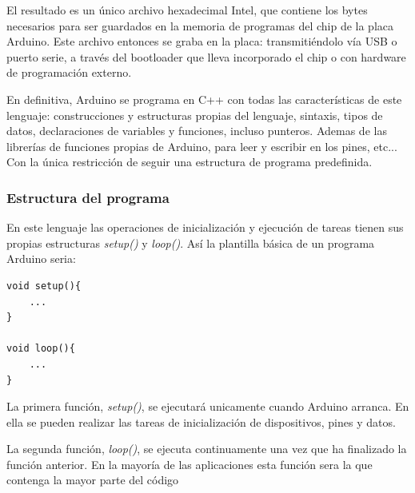 El resultado es un único archivo hexadecimal Intel, que contiene los bytes necesarios para ser guardados en la memoria de programas del chip de la placa Arduino. Este archivo entonces se graba en la placa: transmitiéndolo vía USB o puerto serie, a través del bootloader que lleva incorporado el chip o con hardware de programación externo.

En definitiva, Arduino se programa en C++ con todas las características de este lenguaje: construcciones y estructuras propias del lenguaje, sintaxis, tipos de datos, declaraciones de variables y funciones, incluso punteros. Ademas de las librerías de funciones  propias de Arduino,  para leer  y escribir en los pines, etc... Con la única restricción de seguir una estructura de programa  predefinida.



\subsubsection{Estructura del programa}
En este lenguaje las operaciones de inicialización y ejecución de tareas tienen sus propias estructuras \emph{setup()} y \emph{loop()}. Así la plantilla básica de un programa Arduino seria:

\begin{verbatim}
void setup(){
    ...
}

void loop(){
    ...
}
\end{verbatim}


La primera función, \emph{setup()}, se ejecutará unicamente cuando Arduino arranca. En ella se pueden realizar las tareas de inicialización de dispositivos, pines y datos.

La segunda función, \emph{loop()}, se ejecuta continuamente una vez que ha finalizado la función anterior. En la mayoría de las aplicaciones esta función sera la que contenga la mayor parte del código

